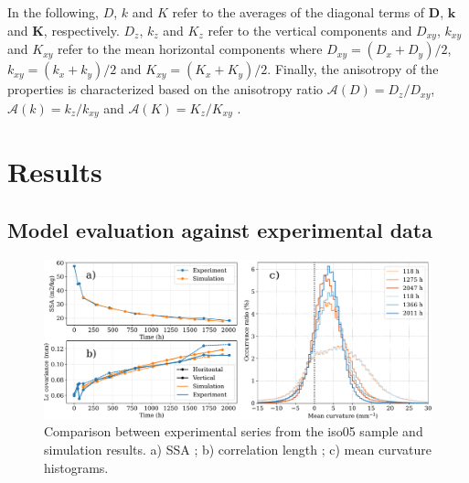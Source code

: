 \documentclass[draft,ms]{agujournal2019}
\begin{document}
In the following, $D$, $k$ and $K$ refer to the averages of the diagonal terms of $\mathbf{D}$, $\mathbf{k}$ and $\mathbf{K}$, respectively. $D_z$, $k_z$ and $K_z$ refer to the vertical components and $D_{xy}$, $k_{xy}$ and $K_{xy}$ refer to the mean horizontal components where $D_{xy} = (D_{x} + D_{y}) /2$, $k_{xy} = (k_{x} + k_{y}) /2$ and $K_{xy} = (K_{x} + K_{y}) /2$. Finally, the anisotropy of the properties is characterized based on the anisotropy ratio $\mathcal{A}(D) = D_z / D_{xy}$, $\mathcal{A}(k) = k_z / k_{xy}$ and $\mathcal{A}(K) = K_z / K_{xy}$ \cite[e.g.]{calonne_study_2014}.


\section{Results}

\subsection{Model evaluation against experimental data}
\label{Section:Calibration}

\begin{figure}
    \centering
    \includegraphics[width=\linewidth]{Figures/flin_evaluation_courbes_lc_ssa_histo.pdf}
    \caption{Comparison between \protect{} experimental series from the iso05 sample and simulation results. a) SSA ; b) correlation length ; c) mean curvature histograms.}
    \label{fig:flin_evaluation}
\end{figure}
\end{document}
